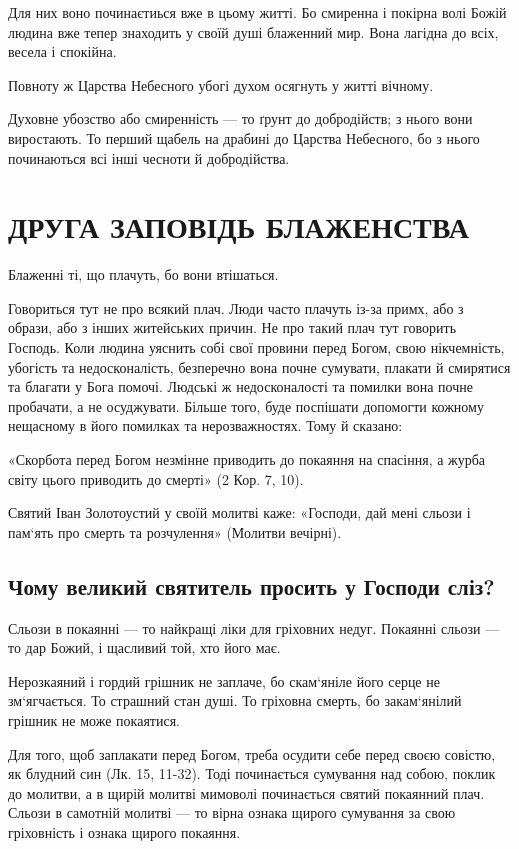 \documentclass[main.tex]{subfiles}
\begin{document}
Для них воно починаєтиься вже в цьому житті. Бо смиренна і покірна волі Божій людина вже тепер знаходить у своїй душі блаженний мир. Вона лагідна до всіх, весела і спокійна.

Повноту ж Царства Небесного убогі духом осягнуть у житті вічному.

Духовне убозство або смиренність — то ґрунт до добродійств; з нього вони виростають. То перший щабель на драбині до Царства Небесного, бо з нього починаються всі інші чесноти й добродійства.

\section{ДРУГА ЗАПОВІДЬ БЛАЖЕНСТВА}

Блаженні ті, що плачуть, бо вони втішаться.

Говориться тут не про всякий плач. Люди часто плачуть із-за примх, або з образи, або з інших житейських причин. Не про такий плач тут говорить Господь. Коли людина уяснить собі свої провини перед Богом, свою нікчемність, убогість та недосконалість, безперечно вона почне сумувати, плакати й смирятися та благати у Бога помочі. Людські ж недосконалості та помилки вона почне пробачати, а не осуджувати. Більше того, буде поспішати допомогти кожному нещасному в його помилках та нерозважностях. Тому й сказано:

«Скорбота перед Богом незмінне приводить до покаяння на спасіння, а журба світу цього приводить до смерті» (2 Кор. 7, 10).

Святий Іван Золотоустий у своїй молитві каже: «Господи, дай мені сльози і пам`ять про смерть та розчулення» (Молитви вечірні).

\subsection{Чому великий святитель просить у Господи сліз?}

Сльози в покаянні — то найкращі ліки для гріховних недуг. Покаянні сльози — то дар Божий, і щасливий той, хто його має.

Нерозкаяний і гордий грішник не заплаче, бо скам`яніле його серце не зм`ягчається. То страшний стан душі. То гріховна смерть, бо закам`янілий грішник не може покаятися.

Для того, щоб заплакати перед Богом, треба осудити себе перед своєю совістю, як блудний син (Лк. 15, 11-32). Тоді починається сумування над собою, поклик до молитви, а в щирій молитві мимоволі починається святий покаянний плач. Сльози в самотній молитві — то вірна ознака щирого сумування за свою гріховність і ознака щирого покаяння.
\end{document}
